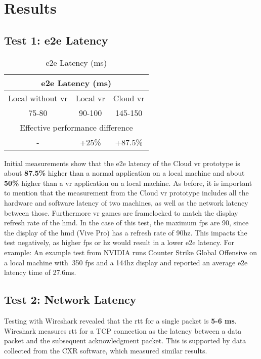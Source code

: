 \section{Results}

\subsection{Test 1: \acrfull{e2e} Latency}
\label{sec:res:t1}
\begin{table}[h!]
\begin{center}
\caption{\acrfull{e2e} Latency (ms)}
\begin{tabular}{ |c|c|c| }
\hline
\multicolumn{3}{|c|}{\acrfull{e2e} Latency (\acrshort{ms})}\\
\hline
\hline
Local without \acrshort{vr} & Local \acrshort{vr} & Cloud \acrshort{vr}\\
\hline
75-80 & 90-100 & 145-150\\
\hline
\multicolumn{3}{|c|}{Effective performance difference}\\
\hline
- & +25\% & +87.5\%\\
\hline
\end{tabular}
\end{center}
\end{table}

Initial measurements show that the \acrshort{e2e} latency of the Cloud \acrshort{vr} prototype is about \textbf{87.5\%} higher than a normal application on a local machine and about \textbf{50\%} higher than a \acrshort{vr} application on a local machine. As before, it is important to mention that the measurement from the Cloud \acrshort{vr}
 prototype includes all the hardware and software latency of two machines, as well as the network latency between those. Furthermore \acrshort{vr} games are framelocked to match the display refresh rate of the \acrshort{hmd}. In the case of this test, the maximum \acrshort{fps} are 90, since the display of the \acrfull{hmd} (Vive Pro) has a refresh rate of 90\acrshort{hz}. This impacts the test negatively, as higher \acrfull{fps} or \acrfull{hz} would result in a lower \acrshort{e2e} latency. For example: An example test from NVIDIA runs Counter Strike Global Offensive on a local machine with $~$350 \acrshort{fps} and a 144\acrshort{hz} display and reported an average \acrshort{e2e} latency time of 27.6\acrshort{ms}.
 
\subsection{Test 2: Network Latency}
\label{sec:res:t2}
Testing with Wireshark \parencite{wireshark} revealed that the \acrfull{rtt} for a single packet is \textbf{5-6 ms}. Wireshark measures \acrshort{rtt} for a TCP connection as the latency between a data packet and the subsequent acknowledgment packet. This is supported by data collected from the CXR \parencite{cloudxr} software, which measured similar results. 

